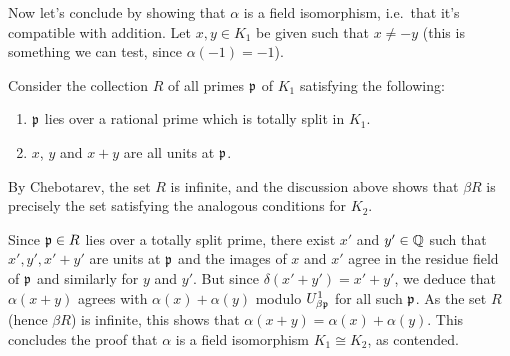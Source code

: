 Now let's conclude by showing that $\alpha$ is a field isomorphism, i.e.~that it's compatible with addition.
Let $x,y \in K_{1}$ be given such that $x \neq -y$ (this is something we can test, since $\alpha(-1) = -1$).

Consider the collection $R$ of all primes $\mathfrak{p}$ of $K_{1}$ satisfying the following:
\begin{enumerate}
  \item $\mathfrak{p}$ lies over a rational prime which is totally split in $K_{1}$.
  \item $x$, $y$ and $x+y$ are all units at $\mathfrak{p}$.
\end{enumerate}
By Chebotarev, the set $R$ is infinite, and the discussion above shows that $\beta R$ is precisely the set satisfying the analogous conditions for $K_{2}$.

Since $\mathfrak{p} \in R$ lies over a totally split prime, there exist $x'$ and $y' \in \mathbb{Q}$ such that $x',y',x'+y'$ are units at $\mathfrak{p}$ and the images of $x$ and $x'$ agree in the residue field of $\mathfrak{p}$ and similarly for $y$ and $y'$.
But since $\delta(x'+y') = x'+y'$, we deduce that $\alpha(x+y)$ agrees with $\alpha(x) + \alpha(y)$ modulo $U_{\beta\mathfrak{p}}^{1}$ for all such $\mathfrak{p}$.
As the set $R$ (hence $\beta R$) is infinite, this shows that $\alpha(x+y) = \alpha(x) + \alpha(y)$.
This concludes the proof that $\alpha$ is a field isomorphism $K_{1} \cong K_{2}$, as contended.


